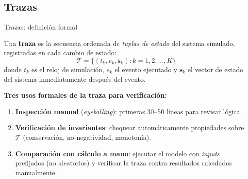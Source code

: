 \documentclass[aspectratio=1610, 10pt]{beamer}
\begin{document}
\subsection{Trazas}

\begin{frame}{Trazas: definición formal}
  \begin{definicionbox}[Traza]
    \footnotesize
    Una \textbf{traza} es la secuencia ordenada de \emph{tuplas de estado} del
    sistema simulado, registradas en cada cambio de estado:
    \[
      \mathcal{T} = \big\{ (t_k, e_k, \mathbf{s}_k) : k=1,2,\ldots,K \big\}
    \]
    donde $t_k$ es el reloj de simulación, $e_k$ el evento ejecutado y
    $\mathbf{s}_k$ el vector de estado del sistema inmediatamente después
    del evento.
  \end{definicionbox}

  \vspace{6pt}
  \footnotesize\textbf{Tres usos formales de la traza para verificación:}
  \begin{enumerate}\itemsep2pt
    \item \textbf{Inspección manual} (\emph{eyeballing}): primeras 30--50
      líneas para revisar lógica.
    \item \textbf{Verificación de invariantes}: chequear automáticamente
      propiedades sobre $\mathcal{T}$ (conservación, no-negatividad, monotonía).
    \item \textbf{Comparación con cálculo a mano}: ejecutar el modelo con
      \emph{inputs} prefijados (no aleatorios) y verificar la traza
      contra resultados calculados manualmente.
  \end{enumerate}
\end{frame}
\end{document}
